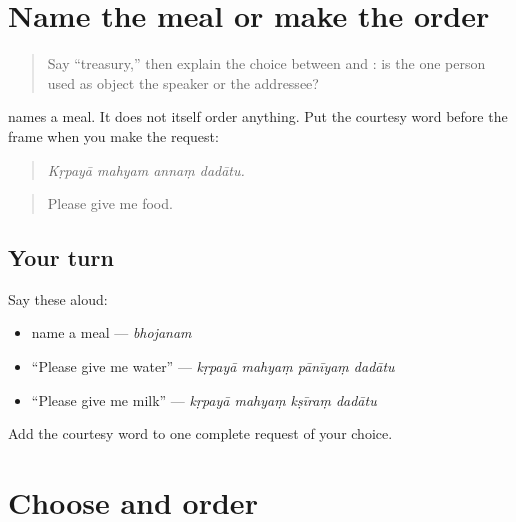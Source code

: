 \section[Practice]{Name the meal or make the order}

\label{lesson:SA-C265-polite-order-contrast}



\begin{quote}
Say “treasury,” then explain the choice between \textbf{} and \textbf{}: is the one person used as object the speaker or the addressee?
\end{quote}

\begin{grammarlens}[title={Grammar Lens: name or request}]
\textbf{} names a meal. It does not itself order anything. Put the courtesy word before the frame when you make the request:

\begin{quote}
\textbf{   }
\end{quote}

\begin{quote}
\emph{Kṛpayā mahyam annaṃ dadātu.}
\end{quote}

\begin{quote}
Please give me food.
\end{quote}
\end{grammarlens}

\subsection*{Your turn}
Say these aloud:

\begin{itemize}
\raggedright
  \item name a meal — \emph{bhojanam}
  \item “Please give me water” — \emph{kṛpayā mahyaṃ pānīyaṃ dadātu}
  \item “Please give me milk” — \emph{kṛpayā mahyaṃ kṣīraṃ dadātu}
\end{itemize}

\begin{tcolorbox}[breakable,colback=teal!4,colframe=teal!35!black,title={Before you move on}]
Add the courtesy word to one complete request of your choice.
\end{tcolorbox}
\section[Practice]{Choose and order}

